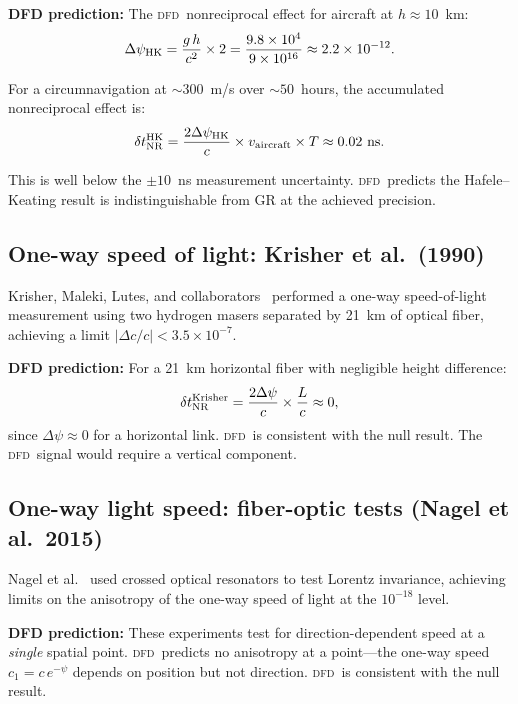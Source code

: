 \documentclass[aps,prl,twocolumn,superscriptaddress,showpacs]{revtex4-2}
\newcommand{\DFD}{\textsc{dfd}}
\begin{document}
\textbf{DFD prediction:}  The \DFD\ nonreciprocal effect for
aircraft at $h \approx 10$~km:
\begin{equation}
\Delta\psi_{\rm HK} = \frac{g\,h}{c^2}\times 2
= \frac{9.8\times 10^4}{9\times 10^{16}} \approx 2.2\times 10^{-12}.
\end{equation}

For a circumnavigation at $\sim 300$~m/s over $\sim 50$~hours,
the accumulated nonreciprocal effect is:
\begin{equation}
\delta t_{\rm NR}^{\rm HK} = \frac{2\Delta\psi_{\rm HK}}{c}
\times v_{\rm aircraft}\times T \approx 0.02~\text{ns}.
\end{equation}

This is well below the $\pm 10$~ns measurement uncertainty.
\DFD\ predicts the Hafele--Keating result is indistinguishable
from GR at the achieved precision.

\subsection{One-way speed of light: Krisher et al.\ (1990)}

Krisher, Maleki, Lutes, and collaborators~\cite{Krisher1990}
performed a one-way speed-of-light measurement using two hydrogen
masers separated by 21~km of optical fiber, achieving a limit
$|\Delta c/c| < 3.5\times 10^{-7}$.

\textbf{DFD prediction:}  For a 21~km horizontal fiber with
negligible height difference:
\begin{equation}
\delta t_{\rm NR}^{\rm Krisher} = \frac{2\Delta\psi}{c}\times\frac{L}{c}
\approx 0,
\end{equation}
since $\Delta\psi \approx 0$ for a horizontal link.  \DFD\ is
consistent with the null result.  The \DFD\ signal would require
a vertical component.

\subsection{One-way light speed: fiber-optic tests (Nagel et al.\ 2015)}

Nagel et al.~\cite{Nagel2015} used crossed optical resonators to
test Lorentz invariance, achieving limits on the anisotropy of the
one-way speed of light at the $10^{-18}$ level.

\textbf{DFD prediction:}  These experiments test for
direction-dependent speed at a \emph{single} spatial point.
\DFD\ predicts no anisotropy at a point---the one-way speed
$c_1 = c\,e^{-\psi}$ depends on position but not direction.
\DFD\ is consistent with the null result.
\end{document}
